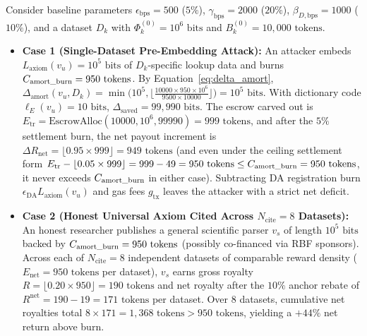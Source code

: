 \documentclass[runningheads,a4paper]{llncs}
\renewcommand{\_}{\textunderscore\allowbreak}
\begin{document}
\begin{example}
\label{ex:numerical_amort}
Consider baseline parameters $\epsilon_{\text{bps}} = 500$ ($5\%$), $\gamma_{\text{bps}} = 2000$ ($20\%$), $\beta_{D,\text{bps}} = 1000$ ($10\%$), and a dataset $D_k$ with $\Phi_k^{(0)} = 10^6\text{ bits}$ and $B_k^{(0)} = 10,000\text{ tokens}$.
\begin{itemize}
  \item \textbf{Case 1 (Single-Dataset Pre-Embedding Attack):} An attacker embeds $L_{\text{axiom}}(v_u) = 10^5\text{ bits}$ of $D_k$-specific lookup data and burns $C_{\text{amort\_burn}} = 950\text{ tokens}$. By Equation~\eqref{eq:delta_amort}, $\Delta_{\text{amort}}(v_u,\allowbreak D_k) = \min\big(10^5,\allowbreak \lfloor \frac{10000 \times 950 \times 10^6}{9500 \times 10000} \rfloor\big) = 10^5\text{ bits}$. With dictionary code $\ell_E(v_u) = 10\text{ bits}$, $\Delta_{\text{saved}} = 99,990\text{ bits}$. The escrow carved out is $E_{\text{tr}} = \text{EscrowAlloc}(10000,\allowbreak 10^6,\allowbreak 99990) = 999\text{ tokens}$, and after the $5\%$ settlement burn, the net payout increment is $\Delta R_{\text{net}} = \lfloor 0.95 \times 999 \rfloor = 949\text{ tokens}$ (and even under the ceiling settlement form $E_{\text{tr}} - \lfloor 0.05 \times 999 \rfloor = 999 - 49 = 950\text{ tokens} \le C_{\text{amort\_burn}} = 950\text{ tokens}$, it never exceeds $C_{\text{amort\_burn}}$ in either case). Subtracting DA registration burn $\epsilon_{\text{DA}} L_{\text{axiom}}(v_u)$ and gas fees $g_{\text{tx}}$ leaves the attacker with a strict net deficit.
  \item \textbf{Case 2 (Honest Universal Axiom Cited Across $N_{\text{cite}} = 8$ Datasets):} An honest researcher publishes a general scientific parser $v_s$ of length $10^5\text{ bits}$ backed by $C_{\text{amort\_burn}} = 950\text{ tokens}$ (possibly co-financed via RBF sponsors). Across each of $N_{\text{cite}} = 8$ independent datasets of comparable reward density ($E_{\text{net}} = 950\text{ tokens}$ per dataset), $v_s$ earns gross royalty $R = \lfloor 0.20 \times 950 \rfloor = 190\text{ tokens}$ and net royalty after the $10\%$ anchor rebate of $R^{\text{net}} = 190 - 19 = 171\text{ tokens}$ per dataset. Over $8$ datasets, cumulative net royalties total $8 \times 171 = 1,368\text{ tokens} > 950\text{ tokens}$, yielding a $+44\%$ net return above burn.
\end{itemize}
\end{example}
\end{document}
